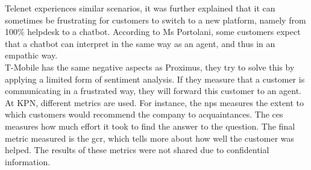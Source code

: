 \break
Telenet experiences similar scenarios, it was further explained that it can sometimes be frustrating for customers to switch to a new platform, namely from 100\% helpdesk to a chatbot. According to Ms Portolani, some customers expect that a chatbot can interpret in the same way as an agent, and thus in an empathic way.\\
\break
T-Mobile has the same negative aspects as Proximus, they try to solve this by applying a limited form of sentiment analysis. If they measure that a customer is communicating in a frustrated way, they will forward this customer to an agent.\\
\break
At KPN, different metrics are used. For instance, the \gls{nps} measures the extent to which customers would recommend the company to acquaintances. The \acrshort{ces} measures how much effort it took to find the answer to the question. The final metric measured is the \acrshort{gcr}, which tells more about how well the customer was helped. The results of these metrics were not shared due to confidential information.\\
\break


